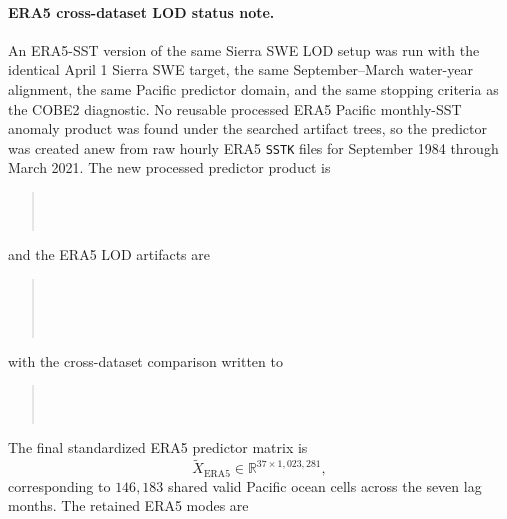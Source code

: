 \documentclass[11pt]{article}
\begin{document}
\paragraph{ERA5 cross-dataset LOD status note.}
An ERA5-SST version of the same Sierra SWE LOD setup was run with the identical April 1 Sierra SWE
target, the same September--March water-year alignment, the same Pacific predictor domain, and the
same stopping criteria as the COBE2 diagnostic. No reusable processed ERA5 Pacific monthly-SST
anomaly product was found under the searched artifact trees, so the predictor was created anew from
raw hourly ERA5 \texttt{SSTK} files for September 1984 through March 2021. The new processed
predictor product is
\begin{quote}
\small
{}\\
\\
\end{quote}
and the ERA5 LOD artifacts are
\begin{quote}
\small
{}\\
\\
\\
\end{quote}
with the cross-dataset comparison written to
\begin{quote}
\small
{}\\
\\
\end{quote}
The final standardized ERA5 predictor matrix is
\begin{equation}
\widetilde{X}_{\mathrm{ERA5}}\in\mathbb{R}^{37\times 1{,}023{,}281},
\end{equation}
corresponding to $146{,}183$ shared valid Pacific ocean cells across the seven lag months. The
retained ERA5 modes are
\end{document}

